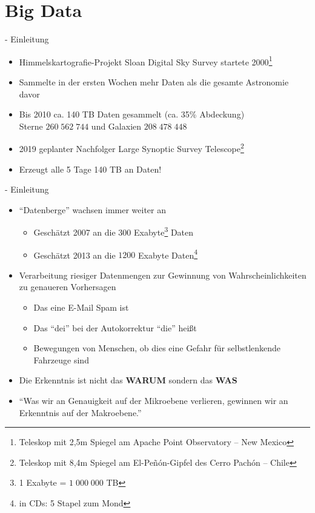 \documentclass[fleqn,11pt,aspectratio=43]{beamer}
\begin{document}

\section{Big Data~}

\begin{frame}[fragile]{\insertsectionhead - Einleitung \cite{mayer2014big} \cite{wu2014data}}
\begin{itemize}
\item Himmelskartografie-Projekt Sloan Digital Sky Survey startete 2000\footnote{Teleskop mit 2,5m Spiegel am Apache Point Observatory -- New Mexico}
\item Sammelte in der ersten Wochen mehr Daten als die gesamte Astronomie davor
\pause
\item Bis 2010 ca. 140 TB Daten gesammelt (ca. 35\% Abdeckung)\\
		Sterne	$260\;562\;744$ und Galaxien $208\;478\;448$ \cite{sdss3_scope:Online}
\item 2019 geplanter Nachfolger Large Synoptic Survey Telescope\footnote{Teleskop mit 8,4m Spiegel am El-Peñón-Gipfel des Cerro Pachón -- Chile}
\pause
\item Erzeugt alle 5 Tage 140 TB an Daten!
\end{itemize}
\end{frame}

\begin{frame}[fragile]{\insertsectionhead - Einleitung \cite{mayer2014big} \cite{wu2014data}}
\begin{itemize}
\item \enquote{Datenberge} wachsen immer weiter an
\begin{itemize}
\item Geschätzt 2007 an die $300$ Exabyte\footnote{1 Exabyte = $1\;000\;000$ TB} Daten 
\item Geschätzt 2013 an die $1200$ Exabyte Daten\footnote{in CDs: 5 Stapel zum Mond}
\end{itemize}
\item Verarbeitung riesiger Datenmengen zur Gewinnung von Wahrscheinlichkeiten
zu genaueren Vorhersagen
\begin{itemize}
\item Das eine E-Mail Spam ist
\item Das \enquote{dei} bei der Autokorrektur \enquote{die} heißt
\item Bewegungen von Menschen, ob dies eine Gefahr für selbstlenkende Fahrzeuge sind
\end{itemize}
\item Die Erkenntnis ist nicht das \textbf{WARUM} sondern das \textbf{WAS} 
\item \enquote{Was wir an
Genauigkeit auf der Mikroebene verlieren, gewinnen wir an Erkenntnis
auf der Makroebene.} \cite{mayer2014big}
\end{itemize}
\end{frame}
\end{document}
